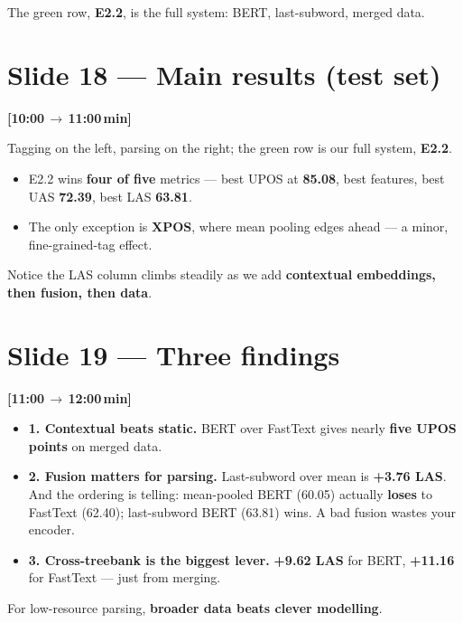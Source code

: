 \documentclass[12pt,a4paper]{article}
\newcommand{\timing}[2]{%
   \par\noindent\textbf{\small [#1\,$\to$\,#2\,min]}\par\vspace{0.2em}}
\newcommand{\say}[1]{\textbf{#1}}
\begin{document}
\noindent
The green row, \textbf{E2.2}, is the full system: BERT, last-subword,
merged data.

\section*{Slide 18 --- Main results (test set)}
\timing{10:00}{11:00}

Tagging on the left, parsing on the right; the green row is our full
system, \textbf{E2.2}.

\begin{itemize}
   \item E2.2 wins \say{four of five} metrics --- best UPOS at \textbf{85.08}, best features, best UAS \textbf{72.39}, best LAS \textbf{63.81}.
   \item The only exception is \textbf{XPOS}, where mean pooling edges ahead --- a minor, fine-grained-tag effect.
\end{itemize}

\noindent
Notice the LAS column climbs steadily as we add \say{contextual
embeddings, then fusion, then data}.

\section*{Slide 19 --- Three findings}
\timing{11:00}{12:00}

\begin{itemize}
   \item \textbf{1. Contextual beats static.} BERT over FastText gives nearly \textbf{five UPOS points} on merged data.
   \item \textbf{2. Fusion matters for parsing.} Last-subword over mean is \textbf{+3.76 LAS}. And the ordering is telling: mean-pooled BERT (60.05) actually \say{loses} to FastText (62.40); last-subword BERT (63.81) wins. A bad fusion wastes your encoder.
   \item \textbf{3. Cross-treebank is the biggest lever.} \textbf{+9.62 LAS} for BERT, \textbf{+11.16} for FastText --- just from merging.
\end{itemize}

\noindent
For low-resource parsing, \say{broader data beats clever modelling}.
\end{document}
